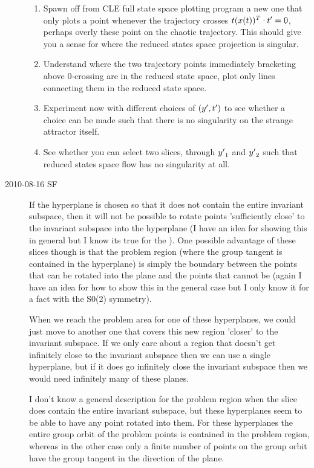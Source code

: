 \begin{description}
\begin{enumerate}
    \item
Spawn off from CLE full state space plotting program a new
one that only plots a point whenever the trajectory crosses
$t(x(t))^T \cdot t'_{} =0$, perhaps overly these point on the chaotic
trajectory. This should give you a sense for where the
reduced states space projection is singular.
    \item
Understand where the two trajectory points immediately
bracketing above 0-crossing are in the reduced state space,
plot only lines connecting them in the reduced state space.
    \item
Experiment now with different choices of $({y'},t'_{})$ to see
whether a choice can be made such that there is no
singularity on the strange attractor itself.
    \item
See whether you can select two slices, through ${y'}_1$ and ${y'}_2$
such that reduced states space flow has no singularity at
all.
\end{enumerate}


\item[2010-08-16 SF]
If the hyperplane is chosen so that it does not contain the
entire invariant subspace, then it will not be possible to
rotate points 'sufficiently close' to the invariant subspace
into the hyperplane (I have an idea for showing this in
general but I know its true for the \cLe ). One possible
advantage of these slices though is that the problem region
(where the group tangent is contained in the hyperplane) is
simply the boundary between the points that can be rotated
into the plane and the points that cannot be (again I have an
idea for how to show this in the general case but I only know
it for a fact with the S0(2) symmetry).

When we reach the problem area for one of these hyperplanes,
we could just move to another one that covers this new region
'closer' to the invariant subspace. If we only care about a
region that doesn't get infinitely close to the invariant
subspace then we can use a single hyperplane, but if it does
go infinitely close the invariant subspace then we would need
infinitely many of these planes.

I don't know a general description for the problem region
when the slice does contain the entire invariant subspace,
but these hyperplanes seem to be able to have any point
rotated into them. For these hyperplanes the entire group
orbit of the problem points is contained in the problem
region, whereas in the other case only a finite number of
points on the group orbit have the group tangent in the
direction of the plane.


\end{description}

